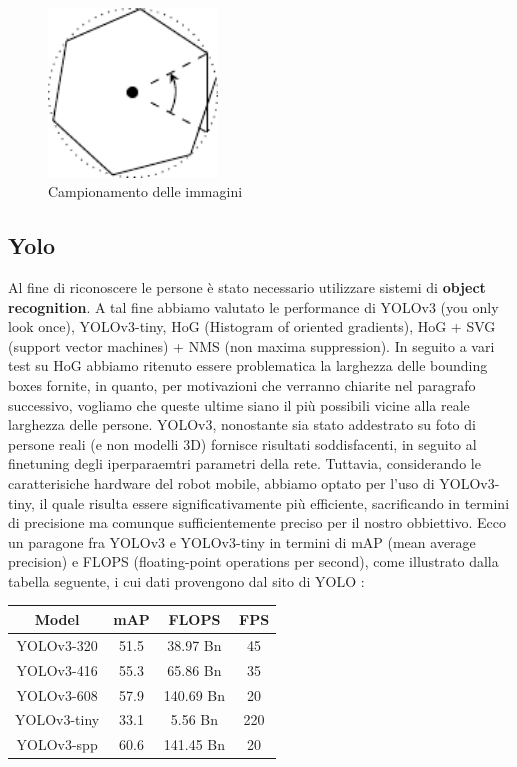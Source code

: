 \documentclass[a4paper]{article}
\begin{document}
	\begin{figure}[H]
		\centering
		\includegraphics[width=0.4\textwidth]{./img/pictures_sampling.pdf}
		\caption{Campionamento delle immagini}
		\label{fig:campionamento_immagini}
	\end{figure}
	
	\subsection{Yolo}\label{subsec:Yolo}
	Al fine di riconoscere le persone è stato necessario utilizzare sistemi di \textbf{object recognition}. A tal fine abbiamo valutato le performance di YOLOv3 (you only look once), YOLOv3-tiny, HoG (Histogram of oriented gradients), HoG + SVG (support vector machines) + NMS (non maxima suppression).
	In seguito a vari test su HoG abbiamo ritenuto essere problematica la larghezza delle bounding boxes fornite, in quanto, per motivazioni che verranno chiarite nel paragrafo successivo, vogliamo che queste ultime siano il più possibili vicine alla reale larghezza delle persone. YOLOv3, nonostante sia stato addestrato su foto di persone reali (e non modelli 3D) fornisce risultati soddisfacenti, in seguito al finetuning degli iperparaemtri parametri della rete. Tuttavia, considerando le caratterisiche hardware del robot mobile, abbiamo optato per l'uso di YOLOv3-tiny, il quale risulta essere significativamente più efficiente, sacrificando in termini di precisione ma comunque sufficientemente preciso per il nostro obbiettivo. Ecco un paragone fra YOLOv3 e YOLOv3-tiny in termini di mAP (mean average precision) e FLOPS (floating-point operations per second), come illustrato dalla tabella seguente, i cui dati provengono dal sito di YOLO \cite{yolo}:
	
	\begin{center}
		\begin{tabular}{ |c|c|c|c| } 
			\hline
			Model & mAP & FLOPS & FPS \\
			\hline	
			 YOLOv3-320    & 51.5  &  38.97  Bn  &  45  \\ 
			 YOLOv3-416    & 55.3  &  65.86  Bn  &  35  \\ 
			 YOLOv3-608    & 57.9  &  140.69 Bn  &  20  \\ 
			 YOLOv3-tiny   & 33.1  &  5.56   Bn  &  220 \\
			 YOLOv3-spp    & 60.6  &  141.45 Bn  &  20  \\
			\hline
		\end{tabular}
	\end{center}
\end{document}
